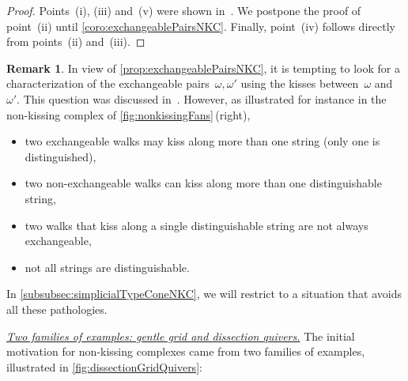 \documentclass{amsart}
\theoremstyle{definition}
\newtheorem{remark}[theorem]{Remark}
\newcommand{\para}[1]{\medskip\noindent\uline{\textit{#1.}}} %
\begin{document}
\begin{proof}
Points~(i), (iii) and~(v) were shown in~\cite[Prop.~2.33, Thm.~4.17 \& Prop~4.16]{PaluPilaudPlamondon-nonkissing}. We postpone the proof of point~(ii) until \cref{coro:exchangeablePairsNKC}. Finally, point~(iv) follows directly from points~(ii) and~(iii).
\end{proof}

\begin{remark}
\label{rem:exchangeablePairsNKC}
\enlargethispage{.7cm}
In view of \cref{prop:exchangeablePairsNKC}, it is tempting to look for a characterization of the exchangeable pairs~$\omega, \omega'$ using the kisses between~$\omega$ and~$\omega'$.
This question was discussed in~\cite[Sect.~9]{BrustleDouvilleMousavandThomasYildirim}.
However, as illustrated for instance in the non-kissing complex of \cref{fig:nonkissingFans}\,(right),
\begin{itemize}
\item two exchangeable walks may kiss along more than one string (only one is distinguished),
\item two non-exchangeable walks can kiss along more than one distinguishable string,
\item two walks that kiss along a single distinguishable string are not always exchangeable,
\item not all strings are distinguishable.
\end{itemize}
In \cref{subsubsec:simplicialTypeConeNKC}, we will restrict to a situation that avoids all these pathologies.
\end{remark}

\para{Two families of examples: gentle grid and dissection quivers}
%
The initial motivation for non-kissing complexes came from two families of examples, illustrated in \cref{fig:dissectionGridQuivers}:
\end{document}
